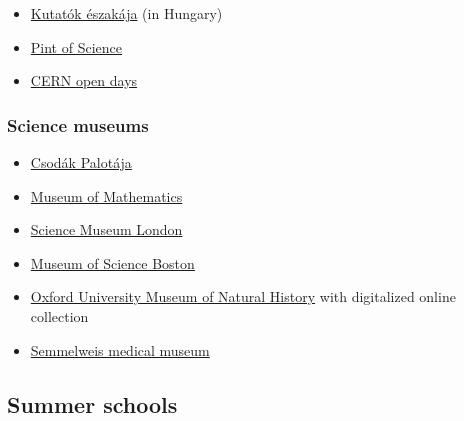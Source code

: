 \documentclass{article}
\begin{document}
\begin{itemize}
    \item \href{https://kutatokejszakaja.hu/}{Kutatók északája} (in Hungary)
    \item \href{https://pintofscience.com/}{Pint of Science}
    \item \href{https://opendays.cern/}{CERN open days}
\end{itemize}

\subsubsection{Science museums}

\begin{itemize}
    \item \href{https://www.csopa.hu/}{Csodák Palotája}
    \item \href{https://momath.org/}{Museum of Mathematics}
    \item \href{https://www.sciencemuseum.org.uk/home}{Science Museum London}
    \item \href{https://www.mos.org/}{Museum of Science Boston}
    \item \href{https://oumnh.ox.ac.uk/}{Oxford University Museum of Natural History} with digitalized online collection
    
    \item \href{http://semmelweismuseum.hu/}{Semmelweis medical museum}
\end{itemize}

\subsection{Summer schools}
\end{document}
